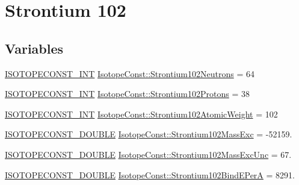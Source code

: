 \hypertarget{group___isotope_const-_strontium-_sr102}{}\section{Strontium 102}
\label{group___isotope_const-_strontium-_sr102}
\subsection*{Variables}
\begin{DoxyCompactItemize}
\item 
\mbox{\hyperlink{group___isotope_const-_macros_ga5f18360b3e99483a35c32d789e62621c}{I\+S\+O\+T\+O\+P\+E\+C\+O\+N\+S\+T\+\_\+\+I\+NT}} \mbox{\hyperlink{group___isotope_const-_strontium-_sr102_ga99f0ffce71dab7524da757080f51ac7c}{Isotope\+Const\+::\+Strontium102\+Neutrons}} = 64
\item 
\mbox{\hyperlink{group___isotope_const-_macros_ga5f18360b3e99483a35c32d789e62621c}{I\+S\+O\+T\+O\+P\+E\+C\+O\+N\+S\+T\+\_\+\+I\+NT}} \mbox{\hyperlink{group___isotope_const-_strontium-_sr102_gae9ac799915c261d575805808663b7c06}{Isotope\+Const\+::\+Strontium102\+Protons}} = 38
\item 
\mbox{\hyperlink{group___isotope_const-_macros_ga5f18360b3e99483a35c32d789e62621c}{I\+S\+O\+T\+O\+P\+E\+C\+O\+N\+S\+T\+\_\+\+I\+NT}} \mbox{\hyperlink{group___isotope_const-_strontium-_sr102_ga76af029f070da66e6560a95cdd859a0a}{Isotope\+Const\+::\+Strontium102\+Atomic\+Weight}} = 102
\item 
\mbox{\hyperlink{group___isotope_const-_macros_ga8f45a7272ce02c0b4c65c44636ed719a}{I\+S\+O\+T\+O\+P\+E\+C\+O\+N\+S\+T\+\_\+\+D\+O\+U\+B\+LE}} \mbox{\hyperlink{group___isotope_const-_strontium-_sr102_ga228b891a747b2c142fee695c3b9182d1}{Isotope\+Const\+::\+Strontium102\+Mass\+Exc}} = -\/52159.
\item 
\mbox{\hyperlink{group___isotope_const-_macros_ga8f45a7272ce02c0b4c65c44636ed719a}{I\+S\+O\+T\+O\+P\+E\+C\+O\+N\+S\+T\+\_\+\+D\+O\+U\+B\+LE}} \mbox{\hyperlink{group___isotope_const-_strontium-_sr102_gac733369df8d9434552e68a21f2e250e5}{Isotope\+Const\+::\+Strontium102\+Mass\+Exc\+Unc}} = 67.
\item 
\mbox{\hyperlink{group___isotope_const-_macros_ga8f45a7272ce02c0b4c65c44636ed719a}{I\+S\+O\+T\+O\+P\+E\+C\+O\+N\+S\+T\+\_\+\+D\+O\+U\+B\+LE}} \mbox{\hyperlink{group___isotope_const-_strontium-_sr102_ga2c9056fc405c4479c274aed65626bd31}{Isotope\+Const\+::\+Strontium102\+Bind\+E\+PerA}} = 8291.
\item 

\end{DoxyCompactItemize}
